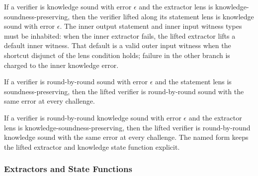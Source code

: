 \begin{theorem}
    \label{thm:lift_context_knowledge_soundness}
    If a verifier is knowledge sound with error $\epsilon$ and the extractor lens is
    knowledge-soundness-preserving, then the verifier lifted along its statement lens is knowledge
    sound with error $\epsilon$. The inner output statement and inner input witness types must be
    inhabited: when the inner extractor fails, the lifted extractor lifts a default inner witness.
    That default is a valid outer input witness when the shortcut disjunct of the lens condition
    holds; failure in the other branch is charged to the inner knowledge error.
    \leanok
\end{theorem}

\begin{theorem}
    \label{thm:lift_context_rbr_soundness}
    If a verifier is round-by-round sound with error $\epsilon$ and the statement lens is
    soundness-preserving, then the lifted verifier is round-by-round sound with the same error at
    every challenge.
    \leanok
\end{theorem}

\begin{theorem}
    \label{thm:lift_context_rbr_knowledge_soundness}
    If a verifier is round-by-round knowledge sound with error $\epsilon$ and the extractor lens is
    knowledge-soundness-preserving, then the lifted verifier is round-by-round knowledge sound with
    the same error at every challenge. The named form keeps the lifted extractor and knowledge
    state function explicit.
    \leanok
\end{theorem}

\subsubsection{Extractors and State Functions}

